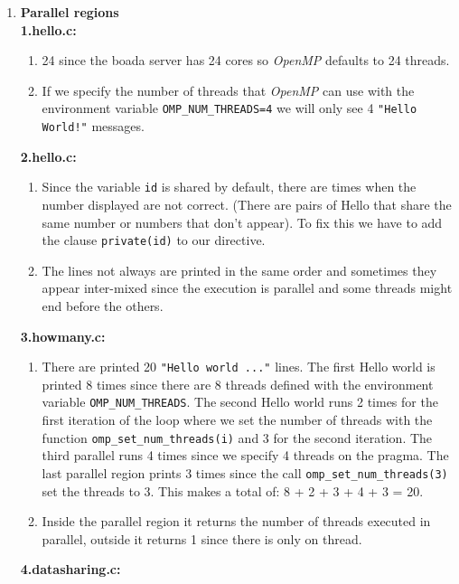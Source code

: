 \begin{enumerate}[label=\textbf{\Alph*)}]
    \item \textbf{Parallel regions} \\
    \textbf{1.hello.c:}
    \begin{enumerate}[label=\arabic*.]
        \item 24 since the boada server has 24 cores so \emph{OpenMP} defaults to 24 threads.
        \item If we specify the number of threads that \emph{OpenMP} can use with the environment variable \texttt{OMP\_NUM\_THREADS=4} we will only
        see 4 \texttt{"Hello World!"} messages.
    \end{enumerate}
    \textbf{2.hello.c:}
    \begin{enumerate}[label=\arabic*.]
        \item Since the variable \texttt{id} is shared by default, there are times when the number displayed are not correct.
        (There are pairs of Hello that share the same number or numbers that don't appear). To fix this we have to add
        the clause \texttt{private(id)} to our directive.
        \item The lines not always are printed in the same order and sometimes they appear inter-mixed since the execution is parallel and some threads might end before the others.
    \end{enumerate}
    \textbf{3.howmany.c:}
    \begin{enumerate}[label=\arabic*.]
        \item There are printed 20 \texttt{"Hello world ..."} lines.
        The first Hello world is printed 8 times since there are 8 threads defined with the environment
        variable \texttt{OMP\_NUM\_THREADS}. The second Hello world runs 2 times for the first iteration of
        the loop where we set the number of threads with the function \texttt{omp\_set\_num\_threads(i)} and
        3 for the second iteration. The third parallel runs 4 times since we specify 4 threads on the
        pragma. The last parallel region prints 3 times since the call \texttt{omp\_set\_num\_threads(3)} 
        set the threads to 3. This makes a total of:  8 + 2 + 3 + 4 + 3 = 20.
        \item Inside the parallel region it returns the number of threads executed in parallel, outside it
        returns 1 since there is only on thread.
    \end{enumerate}
    \textbf{4.datasharing.c:}
    \begin{enumerate}[label=\arabic*.]

\end{enumerate}
\end{enumerate}
